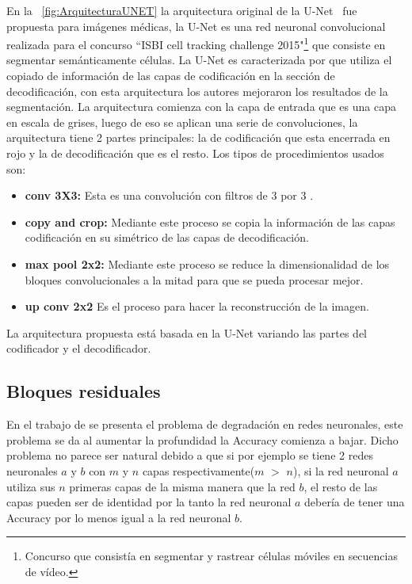 En la \figurename~\ref{fig:ArquitecturaUNET} la arquitectura original de la U-Net~\cite{Ronneberger2015} fue propuesta para imágenes médicas, la U-Net es una red neuronal convolucional realizada para el concurso ``ISBI cell tracking challenge 2015"\footnote{Concurso que consistía en segmentar y rastrear células móviles en secuencias de vídeo.} que consiste en segmentar semánticamente células. La U-Net es caracterizada por que utiliza el copiado de información de las capas de codificación en la sección de decodificación, con esta arquitectura los autores mejoraron los resultados de la segmentación.
La arquitectura comienza con la capa de entrada que es una capa en escala de grises, luego de eso se aplican una serie de convoluciones, la arquitectura tiene 2 partes principales: la de codificación que esta encerrada en rojo y la de decodificación que es el resto. Los tipos de procedimientos usados son:
\begin{itemize}
  \item \textbf{conv 3X3:} Esta es una convolución con filtros de 3 por 3 .
    \item \textbf{copy and crop:} Mediante este proceso se copia la información de las capas codificación en su simétrico de las capas de decodificación.
    \item \textbf{max pool 2x2:} Mediante este proceso se reduce la dimensionalidad de los bloques convolucionales a la mitad para que se pueda procesar mejor.
    \item \textbf{up conv 2x2} Es el proceso para hacer la reconstrucción de la imagen.
\end{itemize}  
La arquitectura propuesta está basada en la U-Net variando las partes del codificador y el decodificador.
\subsection{Bloques residuales}
\label{subsec:residuales}
En el trabajo de \cite{Ruder2016} se presenta el problema de degradación en redes neuronales, este problema se da al aumentar la profundidad la \gls{Accuracy} comienza a bajar. Dicho problema no parece ser natural debido a que si por ejemplo se tiene 2 redes neuronales $a$ y $b$ con $m$ y $n$ capas respectivamente($m$ $>$ $n$), si la red neuronal $a$ utiliza sus $n$ primeras capas de la misma manera que la red $b$, el resto de las capas pueden ser de identidad por la tanto la red neuronal $a$ debería de tener una \gls{Accuracy} por lo menos igual a la red neuronal $b$.  

